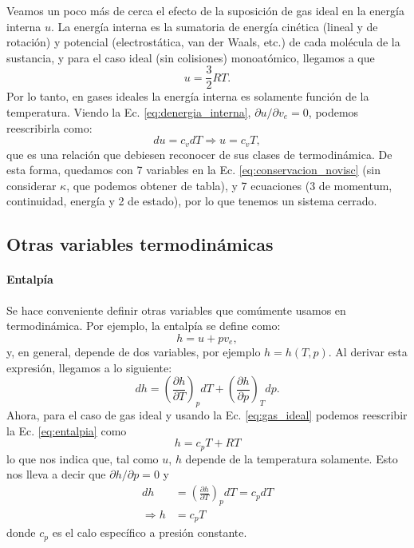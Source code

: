 Veamos un poco más de cerca el efecto de la suposición de gas ideal en la energía interna $u$.
La energía interna es la sumatoria de energía cinética (lineal y de rotación) y potencial (electrostática, van der Waals, etc.) de cada molécula de la sustancia, y para el caso ideal (sin colisiones) monoatómico, llegamos a que
%
\begin{equation}
u = \frac{3}{2}RT.
\end{equation}
%
Por lo tanto, en gases ideales la energía interna es solamente función de la temperatura.
Viendo la Ec. \eqref{eq:denergia_interna}, $\partial u/\partial v_e=0$, podemos reescribirla como:
%
\begin{equation}\label{eq:energia_interna}
du = c_vdT\Rightarrow u=c_vT,
\end{equation}
%
que es una relación que debiesen reconocer de sus clases de termodinámica.
De esta forma, quedamos con 7 variables en la Ec. \eqref{eq:conservacion_novisc} (sin considerar $\kappa$, que podemos obtener de tabla), y 7 ecuaciones (3 de momentum, continuidad, energía y 2 de estado), por lo que tenemos un sistema cerrado.

\subsection*{Otras variables termodinámicas}
\paragraph*{Entalpía}
Se hace conveniente definir otras variables que comúmente usamos en termodinámica.
Por ejemplo, la entalpía se define como:
%
\begin{equation}\label{eq:entalpia}
h = u+ pv_e,
\end{equation}
%
y, en general, depende de dos variables, por ejemplo $h=h(T,p)$.
Al derivar esta expresión, llegamos a lo siguiente:
%
\begin{equation}
dh = \left(\frac{\partial h}{\partial T}\right)_pdT + \left(\frac{\partial h}{\partial p}\right)_Tdp.
\end{equation}
%
Ahora, para el caso de gas ideal y usando la Ec. \eqref{eq:gas_ideal} podemos reescribir la Ec. \eqref{eq:entalpia} como
%
\begin{equation}
h = c_pT + RT
\end{equation}
%
lo que nos indica que, tal como $u$, $h$ depende de la temperatura solamente.
Esto nos lleva a decir que $\partial h/\partial p=0$ y
%
\begin{align}\label{eq:dentalpia}
dh &= \left(\frac{\partial h}{\partial T}\right)_pdT = c_pdT\nonumber\\
\Rightarrow h &= c_pT
\end{align}
%
donde $c_p$ es el calo específico a presión constante.

